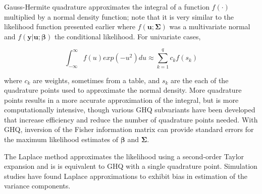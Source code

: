 \documentclass[Afour,times,sagev,doublespace]{sagej}
\begin{document}
\begin{sm}
Gauss-Hermite quadrature approximates the integral of a function $f(\cdot)$ multiplied by a normal density function; note that it is very similar to the likelihood function presented earlier where $f(\mathbf{u}; \mathbf{\Sigma})$ was a multivariate normal and $f(\mathbf{y}|\mathbf{u};\boldsymbol{\beta})$ the conditional likelihood. For univariate cases,

\begin{equation}
    \int_{-\infty}^{\infty}f(u)exp(-u^2)du \approx \sum_{k=1}^q c_kf(s_k)
\end{equation}

where $c_k$ are weights, sometimes from a table, and $s_k$ are the each of the quadrature points used to approximate the normal density. More quadrature points results in a more accurate approximation of the integral, but is more computationally intensive, though various GHQ subvariants have been developed that increase efficiency and reduce the number of quadrature points needed\cite{pinheiro_efficient_2006}. With GHQ, inversion of the Fisher information matrix can provide standard errors for the maximum likelihood estimates of $\boldsymbol{\beta}$ and $\mathbf{\Sigma}$. 


The Laplace method approximates the likelihood using a second-order Taylor expansion \cite{pinheiro_approximations_1995} and is is equivalent to GHQ with a single quadrature point\cite{liu_note_1994}. Simulation studies have found Laplace approximations to exhibit bias in estimation of the variance components\cite{pinheiro_efficient_2006}.
\end{sm}















\end{document}

